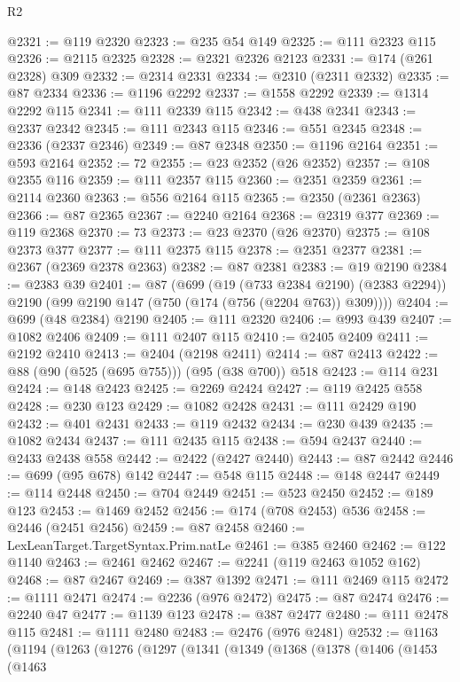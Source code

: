 \begin{lexlean}{R2}
\begin{coremodule}
@2321 := @119 @2320
@2323 := @235 @54 @149
@2325 := @111 @2323 @115
@2326 := @2115 @2325
@2328 := @2321 @2326 @2123
@2331 := @174 (@261 @2328) @309
@2332 := @2314 @2331
@2334 := @2310 (@2311 @2332)
@2335 := @87 @2334
@2336 := @1196 @2292
@2337 := @1558 @2292
@2339 := @1314 @2292 @115
@2341 := @111 @2339 @115
@2342 := @438 @2341
@2343 := @2337 @2342
@2345 := @111 @2343 @115
@2346 := @551 @2345
@2348 := @2336 (@2337 @2346)
@2349 := @87 @2348
@2350 := @1196 @2164
@2351 := @593 @2164
@2352 := 72
@2355 := @23 @2352 (@26 @2352)
@2357 := @108 @2355 @116
@2359 := @111 @2357 @115
@2360 := @2351 @2359
@2361 := @2114 @2360
@2363 := @556 @2164 @115
@2365 := @2350 (@2361 @2363)
@2366 := @87 @2365
@2367 := @2240 @2164
@2368 := @2319 @377
@2369 := @119 @2368
@2370 := 73
@2373 := @23 @2370 (@26 @2370)
@2375 := @108 @2373 @377
@2377 := @111 @2375 @115
@2378 := @2351 @2377
@2381 := @2367 (@2369 @2378 @2363)
@2382 := @87 @2381
@2383 := @19 @2190
@2384 := @2383 @39
@2401 := @87
    (@699
      (@19 (@733 @2384 @2190) (@2383 @2294))
      @2190
      (@99 @2190 @147 (@750 (@174 (@756 (@2204 @763)) @309))))
@2404 := @699 (@48 @2384) @2190
@2405 := @111 @2320
@2406 := @993 @439
@2407 := @1082 @2406
@2409 := @111 @2407 @115
@2410 := @2405 @2409
@2411 := @2192 @2410
@2413 := @2404 (@2198 @2411)
@2414 := @87 @2413
@2422 := @88 (@90 (@525 (@695 @755))) (@95 (@38 @700)) @518
@2423 := @114 @231
@2424 := @148 @2423
@2425 := @2269 @2424
@2427 := @119 @2425 @558
@2428 := @230 @123
@2429 := @1082 @2428
@2431 := @111 @2429 @190
@2432 := @401 @2431
@2433 := @119 @2432
@2434 := @230 @439
@2435 := @1082 @2434
@2437 := @111 @2435 @115
@2438 := @594 @2437
@2440 := @2433 @2438 @558
@2442 := @2422 (@2427 @2440)
@2443 := @87 @2442
@2446 := @699 (@95 @678) @142
@2447 := @548 @115
@2448 := @148 @2447
@2449 := @114 @2448
@2450 := @704 @2449
@2451 := @523 @2450
@2452 := @189 @123
@2453 := @1469 @2452
@2456 := @174 (@708 @2453) @536
@2458 := @2446 (@2451 @2456)
@2459 := @87 @2458
@2460 := LexLeanTarget.TargetSyntax.Prim.natLe
@2461 := @385 @2460
@2462 := @122 @1140
@2463 := @2461 @2462
@2467 := @2241 (@119 @2463 @1052 @162)
@2468 := @87 @2467
@2469 := @387 @1392
@2471 := @111 @2469 @115
@2472 := @1111 @2471
@2474 := @2236 (@976 @2472)
@2475 := @87 @2474
@2476 := @2240 @47
@2477 := @1139 @123
@2478 := @387 @2477
@2480 := @111 @2478 @115
@2481 := @1111 @2480
@2483 := @2476 (@976 @2481)
@2532 := @1163
    (@1194
      (@1263
        (@1276
          (@1297
            (@1341
              (@1349
                (@1368
                  (@1378
                    (@1406
                      (@1453
                        (@1463

\end{coremodule}
\end{lexlean}
